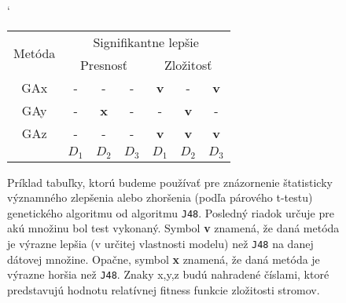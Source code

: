 \begin{figure}[h]
\catcode`
\centering 
\newcommand\T{\rule{0pt}{2.6ex}}       %
\newcommand\B{\rule[-1.2ex]{0pt}{0pt}} %
\begin{tabular}{|c||c c c|c c c||}
\hline
\hline \multirow{2}{*}{Metóda} & \multicolumn{6}{|c||}{Signifikantne lepšie} 
\\
\cline{2-7} & \multicolumn{3}{|c|}{Presnosť} & \multicolumn{3}{|c|}{Zložitosť} \\
\hline
\hline
GAx & - & - & - & \textbf{v} & - & \textbf{v} \\ \hline
GAy & - & \textbf{x} & - & - & \textbf{v} & - \\ \hline
GAz & - & - & - & \textbf{v} & \textbf{v} & \textbf{v} \\ \hline
 & $D_1$ & $D_2$ & $D_3$ & $D_1$ & $D_2$ & $D_3$ \\ \hline
\end{tabular}
\caption{Príklad tabuľky, ktorú budeme používať pre znázornenie štatisticky významného zlepšenia alebo zhoršenia (podľa párového t-testu) genetického algoritmu od algoritmu \texttt{J48}. Posledný riadok určuje pre akú množinu bol test vykonaný. Symbol \textbf{v} znamená, že daná metóda je výrazne lepšia (v určitej vlastnosti modelu) než \texttt{J48} na danej dátovej množine. Opačne, symbol \textbf{x} znamená, že daná metóda je výrazne horšia než \texttt{J48}. Znaky x,y,z budú nahradené číslami, ktoré predstavujú hodnotu relatívnej fitness funkcie zložitosti stromov.}\label{fig:tab3}
\end{figure}

